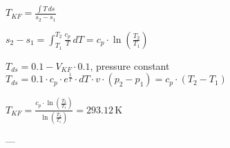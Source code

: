 \( T_{KF} = \frac{\int T \, ds}{s_2 - s_1} \)  

\( s_2 - s_1 = \int_{T_1}^{T_2} \frac{c_p}{T} \, dT = c_p \cdot \ln \left( \frac{T_2}{T_1} \right) \)  

\( T_{ds} = 0.1 - V_{KF} \cdot 0.1 \), pressure constant  
\( T_{ds} = 0.1 \cdot c_p \cdot e^{\frac{1}{T}} \cdot dT \cdot v \cdot (p_2 - p_1) = c_p \cdot (T_2 - T_1) \)  

\( T_{KF} = \frac{c_p \cdot \ln \left( \frac{T_2}{T_1} \right)}{\ln \left( \frac{T_2}{T_1} \right)} = 293.12 \, \text{K} \)  

---